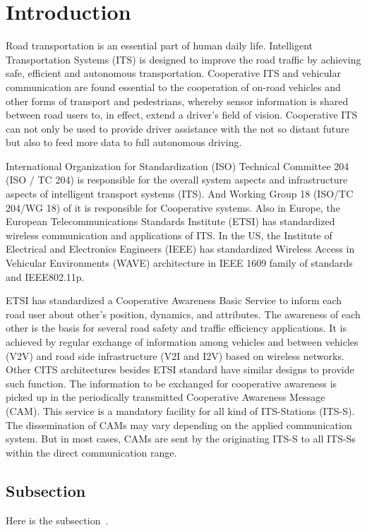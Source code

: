 \section{Introduction} \label{sec:intro}

Road transportation is an essential part of human daily life.
Intelligent Transportation Systems (ITS) is designed to improve the road traffic by achieving safe,
efficient and autonomous transportation.
Cooperative ITS and vehicular communication are found essential to the
cooperation of on-road vehicles and other forms of transport and pedestrians,
whereby sensor information is shared between road users to,
in effect, extend a driver’s field of vision.
Cooperative ITS can not only be used to provide driver assistance with the not so distant future
but also to feed more data to full autonomous driving.

International Organization for Standardization (ISO) Technical Committee 204 (ISO / TC 204)
is responsible for the overall system aspects and infrastructure aspects of intelligent transport systems (ITS).
And Working Group 18 (ISO/TC 204/WG 18) of it is responsible for Cooperative systems.
Also in Europe, the European Telecommunications Standards Institute (ETSI) has standardized wireless communication and applications of ITS.
In the US, the Institute of Electrical and Electronics Engineers (IEEE) has standardized Wireless Access
in Vehicular Environments (WAVE) architecture in IEEE 1609 family of standards and IEEE802.11p.

ETSI has standardized a Cooperative Awareness Basic Service to inform each road user about other's position, dynamics, and attributes.
The awareness of each other is the basis for several road safety and traffic efficiency applications.
It is achieved by regular exchange of information among vehicles and between vehicles (V2V)
and road side infrastructure (V2I and I2V) based on wireless networks.
Other CITS architectures besides ETSI standard have similar designs to provide such function.
The information to be exchanged for cooperative awareness is picked up in the periodically transmitted Cooperative Awareness Message (CAM).
This service is a mandatory facility for all kind of ITS-Stations (ITS-S).
The dissemination of CAMs may vary depending on the applied communication system.
But in most cases, CAMs are sent by the originating ITS-S to all ITS-Ss within the direct communication range.

\subsection{Subsection}

Here is the subsection~\cite{kitazato2016proxy}.